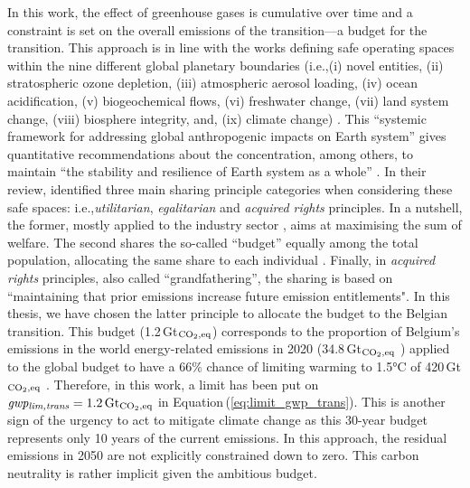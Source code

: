 \documentclass[11pt,twoside,a4paper,english]{article}
\def\ie{i.e.,}
\def\og{``}
\def\fg{"}
\begin{document}
\begin{appendices}
In this work, the effect of greenhouse gases is cumulative over time and a constraint is set on the overall emissions of the transition---a  budget for the transition. This approach is in line with the works defining safe operating spaces within the nine different global planetary boundaries (\ie (i) novel entities, (ii) stratospheric ozone depletion, (iii) atmospheric aerosol loading, (iv) ocean acidification, (v) biogeochemical flows, (vi) freshwater change, (vii) land system change, (viii) biosphere integrity, and, (ix) climate change) \cite{richardson2023earth,steffen2015planetary,rockstrom2009safe}. This ``systemic framework for addressing global anthropogenic impacts on Earth system'' gives quantitative recommendations about the  concentration, among others, to maintain ``the stability and resilience of Earth system as a whole'' \cite{richardson2023earth}. In their review, \citet{ryberg2020downscaling} identified three main sharing principle categories when considering these safe spaces: \ie \textit{utilitarian}, \textit{egalitarian} and \textit{acquired rights} principles. In a nutshell, the former, mostly applied to the industry sector \cite{ryberg2018bring,brejnrod2017absolute}, aims at maximising the sum of welfare. The second shares the so-called ``budget'' equally among the total population, allocating the same share to each individual \cite{hoff2017bringing,o2018good}. Finally, in \textit{acquired rights} principles, also called ``grandfathering'', the sharing is based on \og maintaining that prior emissions increase future emission entitlements\fg  \cite{knight2013grandfathering}. In this thesis, we have chosen the latter principle to allocate the  budget to the Belgian transition. This budget (1.2\,Gt$_{\ce{CO2},\text{eq}}$) corresponds to the proportion of Belgium's emissions in the world energy-related emissions in 2020 (34.8\,Gt$_{\ce{CO2},\text{eq}}$ \cite{ourworldindata_CO2_world}) applied to the global budget to have a 66\% chance of limiting warming to 1.5°C of 420\,Gt$_{\ce{CO2},\text{eq}}$ \cite{IPCC_CO2_budget}. Therefore, in this work, a limit has been put on $\emph{gwp\textsubscript{lim,trans}}=1.2\,\text{Gt}_{\ce{CO2},\text{eq}}$ in Equation\,(\ref{eq:limit_gwp_trans}). This is another sign of the urgency to act to mitigate climate change as this 30-year budget represents only 10 years of the current emissions.  In this approach, the residual emissions in 2050 are not explicitly constrained down to zero. This carbon neutrality is rather implicit given the ambitious  budget.


\end{appendices}
\end{document}
